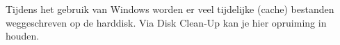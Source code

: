 Tijdens het gebruik van Windows worden er veel tijdelijke (cache) bestanden weggeschreven op de harddisk. Via Disk Clean-Up kan je hier opruiming in houden.

\begin{minipage}[t]{\linewidth}
\raggedright
{}
\end{minipage}

